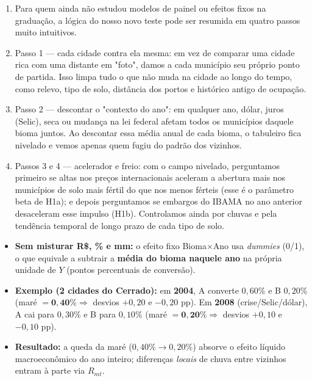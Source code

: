 \documentclass[11pt,a4paper]{article}
\begin{document}
\vspace{1mm}
\begin{enumerate}[leftmargin=*,label=\textbf{(\arabic*)},itemsep=1.8mm,topsep=1mm]
    \item Para quem ainda não estudou modelos de painel ou efeitos fixos na graduação, a lógica do nosso novo teste pode ser resumida em quatro passos muito intuitivos.
    \item Passo 1 — cada cidade contra ela mesma: em vez de comparar uma cidade rica com uma distante em "foto", damos a cada município seu próprio ponto de partida. Isso limpa tudo o que não muda na cidade ao longo do tempo, como relevo, tipo de solo, distância dos portos e histórico antigo de ocupação.
    \item Passo 2 — descontar o "contexto do ano": em qualquer ano, dólar, juros (Selic), seca ou mudança na lei federal afetam todos os municípios daquele bioma juntos. Ao descontar essa média anual de cada bioma, o tabuleiro fica nivelado e vemos apenas quem fugiu do padrão dos vizinhos.
    \item Passos 3 e 4 — acelerador e freio: com o campo nivelado, perguntamos primeiro se altas nos preços internacionais aceleram a abertura mais nos municípios de solo mais fértil do que nos menos férteis (esse é o parâmetro beta de H1a); e depois perguntamos se embargos do IBAMA no ano anterior desaceleram esse impulso (H1b). Controlamos ainda por chuvas e pela tendência temporal de longo prazo de cada tipo de solo.
\end{enumerate}

\vspace{1.5mm}
\begin{tcolorbox}[colback=azul!5,colframe=azul,title={\bfseries\small SE PERGUNTAREM: COMO DESCONTAR DÓLAR, SELIC E CLIMA COM UNIDADES DISTINTAS?},left=3mm,right=3mm,top=2mm,bottom=2mm]
{\small
\begin{itemize}[leftmargin=*,itemsep=0.8mm,topsep=0.3mm]
    \item \textbf{Sem misturar R\$, \% e mm:} o efeito fixo Bioma$\times$Ano usa \textit{dummies} (0/1), o que equivale a subtrair a \textbf{média do bioma naquele ano} na própria unidade de $Y$ (pontos percentuais de conversão).
    \item \textbf{Exemplo (2 cidades do Cerrado):} em \textbf{2004}, A converte $0{,}60\%$ e B $0{,}20\%$ (maré $= \mathbf{0{,}40\%} \Rightarrow$ desvios $+0{,}20$ e $-0{,}20$ pp). Em \textbf{2008} (crise/Selic/dólar), A cai para $0{,}30\%$ e B para $0{,}10\%$ (maré $= \mathbf{0{,}20\%} \Rightarrow$ desvios $+0{,}10$ e $-0{,}10$ pp).
    \item \textbf{Resultado:} a queda da maré ($0{,}40\% \to 0{,}20\%$) absorve o efeito líquido macroeconômico do ano inteiro; diferenças \textit{locais} de chuva entre vizinhos entram à parte via $R_{mt}$.
\end{itemize}
}
\end{tcolorbox}
\end{document}
